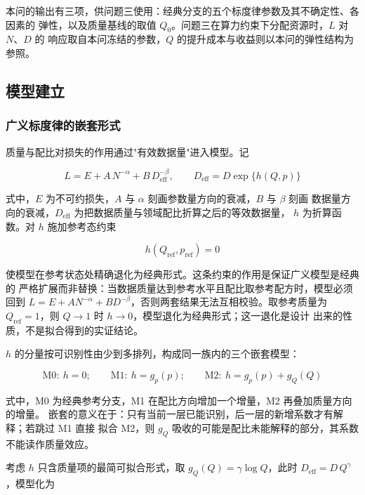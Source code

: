 \documentclass[bwprint]{gmcmthesis}
\numberwithin{equation}{section}
\numberwithin{figure}{section}
\numberwithin{table}{section}
\begin{document}
本问的输出有三项，供问题三使用：经典分支的五个标度律参数及其不确定性、各因素的
弹性，以及质量基线的取值 $Q_0$。问题三在算力约束下分配资源时，$L$ 对 $N$、$D$ 的
响应取自本问冻结的参数，$Q$ 的提升成本与收益则以本问的弹性结构为参照。

\subsection{模型建立}

\subsubsection{广义标度律的嵌套形式}

质量与配比对损失的作用通过"有效数据量"进入模型。记

\begin{equation}
L=E+A\,N^{-\alpha}+B\,D_{\mathrm{eff}}^{-\beta},\qquad
D_{\mathrm{eff}}=D\exp\{h(Q,p)\}
\end{equation}

式中，$E$ 为不可约损失，$A$ 与 $\alpha$ 刻画参数量方向的衰减，$B$ 与 $\beta$ 刻画
数据量方向的衰减，$D_{\mathrm{eff}}$ 为把数据质量与领域配比折算之后的等效数据量，
$h$ 为折算函数。对 $h$ 施加参考态约束

\begin{equation}
h(Q_{\mathrm{ref}},p_{\mathrm{ref}})=0
\end{equation}

使模型在参考状态处精确退化为经典形式。这条约束的作用是保证广义模型是经典的
严格扩展而非替换：当数据质量达到参考水平且配比取参考配方时，模型必须回到
$L=E+AN^{-\alpha}+BD^{-\beta}$，否则两套结果无法互相校验。取参考质量为
$Q_{\mathrm{ref}}=1$，则 $Q\to 1$ 时 $h\to 0$，模型退化为经典形式；这一退化是设计
出来的性质，不是拟合得到的实证结论。

$h$ 的分量按可识别性由少到多排列，构成同一族内的三个嵌套模型：

\begin{equation}
\text{M0}:\ h=0;\qquad
\text{M1}:\ h=g_p(p);\qquad
\text{M2}:\ h=g_p(p)+g_Q(Q)
\end{equation}

式中，M0 为经典参考分支，M1 在配比方向增加一个增量，M2 再叠加质量方向的增量。
嵌套的意义在于：只有当前一层已能识别，后一层的新增系数才有解释；若跳过 M1 直接
拟合 M2，则 $g_Q$ 吸收的可能是配比未能解释的部分，其系数不能读作质量效应。

考虑 $h$ 只含质量项的最简可拟合形式，取 $g_Q(Q)=\gamma\log Q$，此时
$D_{\mathrm{eff}}=D\,Q^{\gamma}$，模型化为
\end{document}
